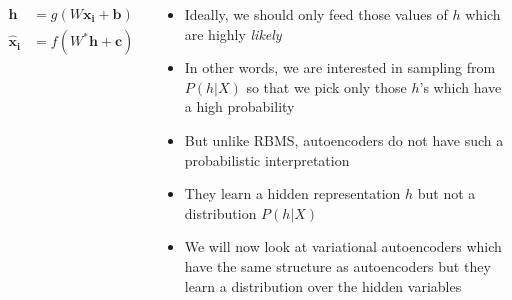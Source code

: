 \begin{frame}
	\begin{columns}
		\begin{overlayarea}{\textwidth}{\textheight}
			\vspace{3pt}
			
			\vspace{-20pt}
			\begin{align*}
				\mathbf{h} &= g(W\mathbf{x_i} +\mathbf{b})\\
				\mathbf{\hat{x}_i} &= f(W^*\mathbf{h} +\mathbf{c})      
			\end{align*}
		\end{overlayarea}
		\begin{overlayarea}{\textwidth}{\textheight}
			\begin{itemize}\justifying
				\item<1-> Ideally, we should only feed those values of $h$ which are highly \textit{likely} 
				\item<2-> In other words, we are interested in sampling from $P(h|X)$ so that we pick only those $h$'s which have a high probability
				\item<3-> But unlike RBMS, autoencoders do not have such a probabilistic interpretation
				\item<4-> They learn a hidden representation $h$ but not a distribution $P(h|X)$
				\item<5-> We will now look at variational autoencoders which have the same structure as autoencoders but they learn a distribution over the hidden variables
			\end{itemize}
		\end{overlayarea}
	\end{columns}
\end{frame}



